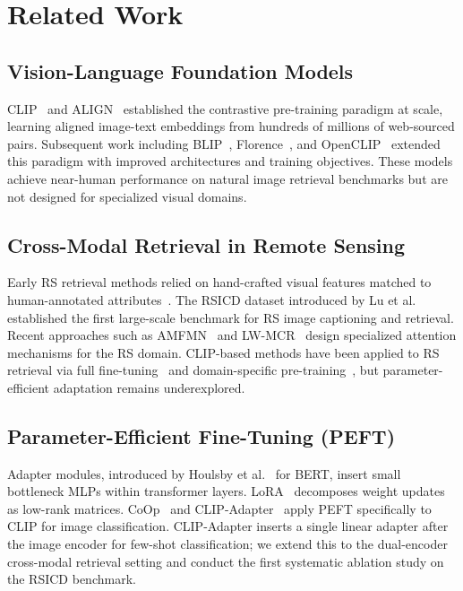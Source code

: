 \documentclass[review,12pt]{elsarticle}
\begin{document}
\section{Related Work}
\label{sec:related}

\subsection{Vision-Language Foundation Models}
CLIP~\cite{radford2021clip} and ALIGN~\cite{jia2021scaling} established the
contrastive pre-training paradigm at scale, learning aligned image-text
embeddings from hundreds of millions of web-sourced pairs. Subsequent work
including BLIP~\cite{li2022blip}, Florence~\cite{yuan2021florence}, and
OpenCLIP~\cite{cherti2023reproducible} extended this paradigm with improved
architectures and training objectives. These models achieve near-human
performance on natural image retrieval benchmarks but are not designed for
specialized visual domains.

\subsection{Cross-Modal Retrieval in Remote Sensing}
Early RS retrieval methods relied on hand-crafted visual features matched to
human-annotated attributes~\cite{lu2017exploring}. The RSICD dataset
introduced by Lu et al.~\cite{lu2017exploring} established the first
large-scale benchmark for RS image captioning and retrieval. Recent
approaches such as AMFMN~\cite{yuan2021amfmn} and LW-MCR~\cite{yuan2022lwmcr}
design specialized attention mechanisms for the RS domain. CLIP-based methods
have been applied to RS retrieval via full fine-tuning~\cite{liu2024remoteclip}
and domain-specific pre-training~\cite{zhang2023rsclip}, but
parameter-efficient adaptation remains underexplored.

\subsection{Parameter-Efficient Fine-Tuning (PEFT)}
Adapter modules, introduced by Houlsby et al.~\cite{houlsby2019adapters} for
BERT, insert small bottleneck MLPs within transformer layers. LoRA~\cite{hu2022lora}
decomposes weight updates as low-rank matrices. CoOp~\cite{zhou2022coop} and
CLIP-Adapter~\cite{gao2024clipadapter} apply PEFT specifically to CLIP for
image classification. CLIP-Adapter inserts a single linear adapter after the
image encoder for few-shot classification; we extend this to the dual-encoder
cross-modal retrieval setting and conduct the first systematic ablation study
on the RSICD benchmark.
\end{document}
